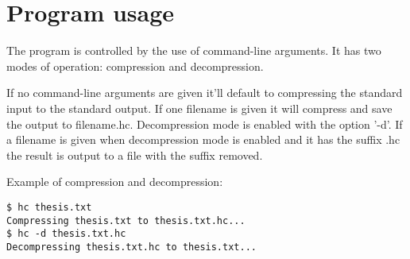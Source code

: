 \documentclass[11pt,a4paper]{article}
\begin{document}
\section {Program usage}

The program is controlled by the use of command-line arguments. It
has two modes of operation: compression and decompression.

If no command-line arguments are given it'll default to compressing
the standard input to the standard output. If one filename is given it
will compress and save the output to filename.hc.  Decompression mode
is enabled with the option '-d'. If a filename is given when
decompression mode is enabled and it has the suffix .hc the result is
output to a file with the suffix removed.

Example of compression and decompression:

\begin{verbatim}
$ hc thesis.txt
Compressing thesis.txt to thesis.txt.hc...
$ hc -d thesis.txt.hc
Decompressing thesis.txt.hc to thesis.txt...
\end{verbatim}



\end{document}
